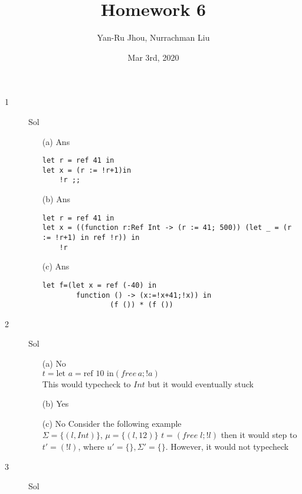 \documentclass{article}
\title{Homework 6}
\author{Yan-Ru Jhou, Nurrachman Liu}
\date{Mar 3rd, 2020}
\begin{document}
    \maketitle

    \begin{description}
        \item[1]{Sol}\\
            \begin{enumerate}
                \item[(a)]{Ans}\\
                \begin{lstlisting}
let r = ref 41 in
let x = (r := !r+1)in
    !r ;;
                \end{lstlisting}
                \item[(b)]{Ans} \\
                \begin{lstlisting}
let r = ref 41 in
let x = ((function r:Ref Int -> (r := 41; 500)) (let _ = (r := !r+1) in ref !r)) in
    !r
                \end{lstlisting}
                \item[(c)]{Ans} \\
                \begin{lstlisting}
let f=(let x = ref (-40) in
        function () -> (x:=!x+41;!x)) in
                (f ()) * (f ())
                \end{lstlisting}
            \end{enumerate}
        \item [2]{Sol}
            \begin{enumerate}
                \item[(a)]{No}\\
                $t = \text{let } a = \text{ref } 10 \text{ in} (free\, a;!a)$ \\ This would typecheck to $Int$ but it would eventually stuck
                \item[(b)]{Yes}\\
                \item[(c)]{No} Consider the following example\\
                $\Sigma=\{(l,Int)\}$,\;  $\mu=\{(l,12)\}$\;
                $t=(free\; l;!l)$ then it would step to\\
                $t'=(!l)$, where $u'=\{\},\Sigma'=\{\}$.
                However, it would not typecheck
            \end{enumerate}
        \item[3]{Sol}

\end{description}
\end{document}
